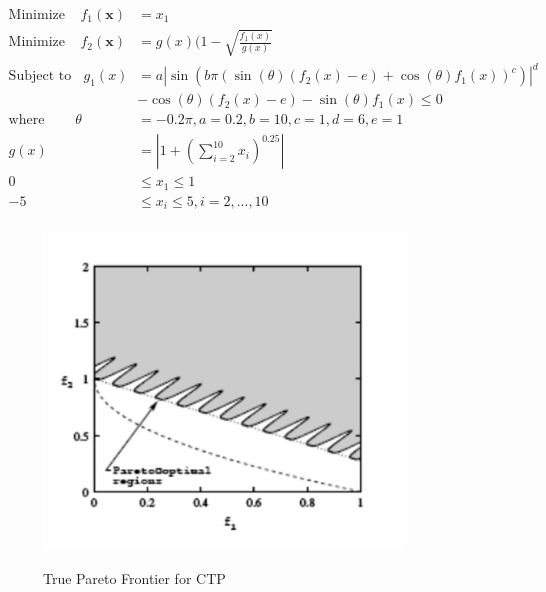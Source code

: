 \documentclass{article}
\begin{document}
\begin{align*}
\textrm{Minimize} ~~~~~ f_1(\textbf{x}) &= x_1 \\
\textrm{Minimize} ~~~~~ f_2(\textbf{x}) &= g(x)(1-\sqrt{\frac{f_1(x)}{g(x)}} \\
\textrm{Subject to} ~~~~ g_1(x) &= a|\sin(b\pi(\sin(\theta)(f_2(x)-e)+\cos(\theta)f_1(x))^c)|^d \\
&- \cos(\theta)(f_2(x)-e)-\sin(\theta)f_1(x) \leq 0 \\
\textrm{where} ~~~~~~~~~~ \theta &= -0.2\pi, a = 0.2, b=10, c=1, d=6, e = 1 \\
g(x) &= |1+(\sum_{i=2}^{10}x_i)^{0.25}| \\
0 &\leq  x_1  \leq 1 \\
-5 &\leq  x_i  \leq 5, i = 2,...,10 \\
\end{align*}
\begin{figure}[h]
  \caption{True Pareto Frontier for CTP}
  \centering
  \includegraphics[width=0.85\textwidth]{CTP_pareto_true.png}  
  \label{fig:CTP_true}
\end{figure}
\end{document}

